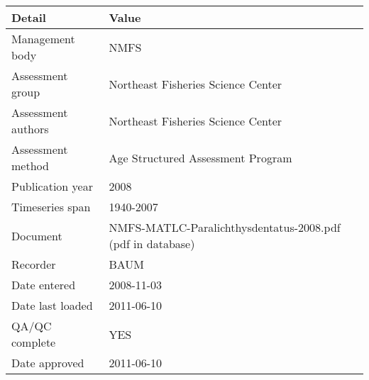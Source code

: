 \begin{table}[htb]
\centering
\begin{tabular}{lp{7cm}}
\toprule
Detail & Value \\
\midrule
Management body    & NMFS                                                       \\
Assessment group   & Northeast Fisheries Science Center                         \\
Assessment authors & Northeast Fisheries Science Center                         \\
Assessment method  & Age Structured Assessment Program                          \\
Publication year   & 2008                                                       \\
Timeseries span    & 1940-2007                                                  \\
Document           & NMFS-MATLC-Paralichthysdentatus-2008.pdf (pdf in database) \\
Recorder           & BAUM                                                       \\
Date entered       & 2008-11-03                                                 \\
Date last loaded   & 2011-06-10                                                 \\
QA/QC complete     & YES                                                        \\
Date approved      & 2011-06-10                                                 \\
\bottomrule
\end{tabular}
\label{tab:assessdet}
\end{table}
